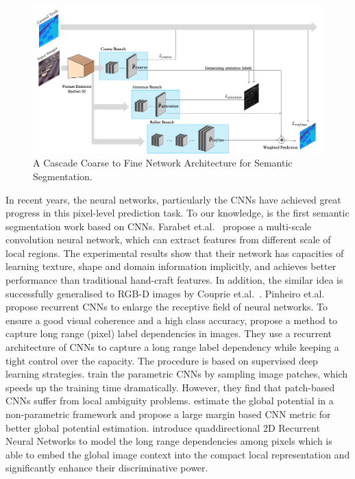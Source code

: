 \documentclass[10.5pt,compsoc]{TsT}
\newcommand{\upcite}[1]{\superscript{\textsuperscript{\cite{#1}}}}
\theoremstyle{mystyle}
\newcommand{\upcite}[1]{\textsuperscript{\cite{#1}}}
\begin{document}
{\begin{figure}[!ht]
\centering
\includegraphics[width=1.9\columnwidth]{fig2.png}
\caption{A Cascade Coarse to Fine Network Architecture for Semantic Segmentation.}
\label{fig2}
\end{figure} 

In recent years, the neural networks, particularly the CNNs have achieved great progress in this pixel-level prediction task. To our knowledge,  \cite{11} is the first semantic segmentation work based on CNNs. Farabet et.al.~\upcite{11} propose a multi-scale convolution neural network, which can extract features from different scale of local regions. The experimental results show that their network has capacities of learning texture, shape and domain information implicitly, and achieves better performance than traditional hand-craft features. 
In addition, the similar idea is successfully generalised to RGB-D images by Couprie et.al.~\upcite{12}.
Pinheiro et.al.~ propose recurrent CNNs to enlarge the receptive field of neural networks.
 To ensure a good visual coherence and a high class accuracy, \cite{13} propose a method to capture long range (pixel) label dependencies in images. They use a recurrent architecture of CNNs to capture a long range label dependency while keeping a tight control over the capacity. The procedure is based on supervised deep learning strategies. \cite{14-16} train the parametric CNNs by sampling image patches, which speeds up the training time dramatically. However, they find that patch-based CNNs suffer from local ambiguity problems. \cite{14} estimate the global potential in a non-parametric framework and propose a large margin based CNN metric for better global potential estimation. \cite{15,16} introduce quaddirectional 2D Recurrent Neural Networks to model the long range dependencies among pixels which is able to embed the global image context into the compact local representation and significantly enhance their discriminative power.


}
\end{document}
